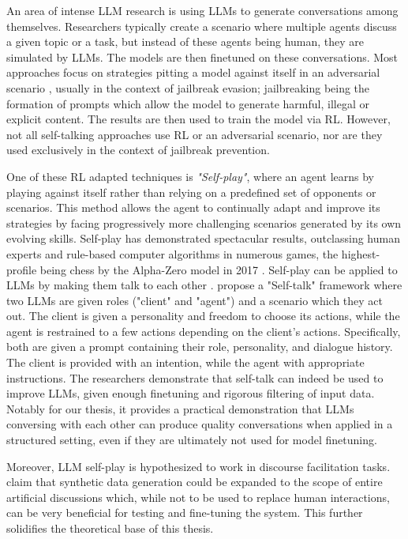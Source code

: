 An area of intense LLM research is using LLMs to generate conversations among themselves. Researchers typically create a scenario where multiple agents discuss a given topic or a task, but instead of these agents being human, they are simulated by LLMs. The models are then finetuned on these conversations. Most approaches focus on strategies pitting a model against itself in an adversarial scenario \cite{liu2024largelanguagemodelsagents, cheng2024selfplayingadversariallanguagegame, zheng2024optimalllmalignmentsusing}, usually in the context of jailbreak evasion; jailbreaking being the formation of prompts which allow the model to generate harmful, illegal or explicit content. The results are then used to train the model via \ac{RL}. However, not all self-talking approaches use \ac{RL} or an adversarial scenario, nor are they used exclusively in the context of jailbreak prevention.

One of these \ac{RL} adapted techniques is \textit{"Self-play"}, where an agent learns by playing against itself rather than relying on a predefined set of opponents or scenarios. This method allows the agent to continually adapt and improve its strategies by facing progressively more challenging scenarios generated by its own evolving skills. Self-play has demonstrated spectacular results, outclassing human experts and rule-based computer algorithms in numerous games, the highest-profile being chess by the Alpha-Zero model in 2017 \cite{silver2017masteringchessshogiselfplay}. Self-play can be applied to LLMs by making them talk to each other \cite{cheng2024selfplayingadversariallanguagegame}.  \citet{ulmer2024bootstrappingllmbasedtaskorienteddialogue} propose a "Self-talk" framework where two LLMs are given roles ("client" and "agent") and a scenario which they act out. The client is given a personality and freedom to choose its actions, while the agent is restrained to a few actions depending on the client's actions. Specifically, both are given a prompt containing their role, personality, and dialogue history. The client is provided with an intention, while the agent with appropriate instructions. The researchers demonstrate that self-talk can indeed be used to improve LLMs, given enough finetuning and rigorous filtering of input data. Notably for our thesis, it provides a practical demonstration that LLMs conversing with each other can produce quality conversations when applied in a structured setting, even if they are ultimately not used for model finetuning.

Moreover, LLM self-play is hypothesized to work in discourse facilitation tasks. \citet{small-polis-llm} claim that synthetic data generation could be expanded to the scope of entire artificial discussions which, while not to be used to replace human interactions, can be very beneficial for testing and fine-tuning the system. This further solidifies the theoretical base of this thesis. 


